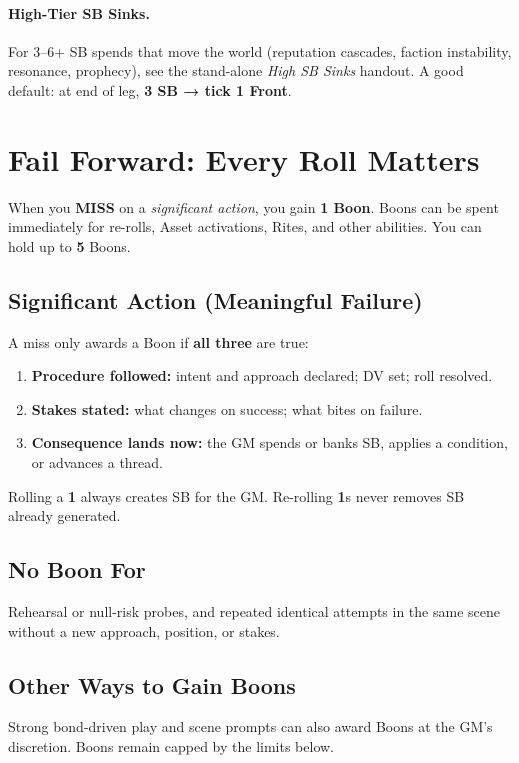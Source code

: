 \paragraph{High-Tier SB Sinks.}
For 3–6+ SB spends that move the world (reputation cascades, faction instability, resonance, prophecy), see the stand-alone \emph{High SB Sinks} handout. A good default: at end of leg, \textbf{3 SB → tick 1 Front}.

\section{Fail Forward: Every Roll Matters}

When you \textbf{MISS} on a \emph{significant action}, you gain \textbf{1 Boon}. Boons can be spent immediately for re-rolls, Asset activations, Rites, and other abilities. You can hold up to \textbf{5} Boons.

\subsection{Significant Action (Meaningful Failure)}
A miss only awards a Boon if \textbf{all three} are true:
\begin{enumerate}
  \item \textbf{Procedure followed:} intent and approach declared; DV set; roll resolved.
  \item \textbf{Stakes stated:} what changes on success; what bites on failure.
  \item \textbf{Consequence lands now:} the GM spends or banks SB, applies a condition, or advances a thread.
\end{enumerate}
\noindent Rolling a \textbf{1} always creates SB for the GM. Re-rolling \textbf{1}s never removes SB already generated.

\subsection{No Boon For}
Rehearsal or null-risk probes, and repeated identical attempts in the same scene without a new approach, position, or stakes.

\subsection{Other Ways to Gain Boons}
Strong bond-driven play and scene prompts can also award Boons at the GM's discretion. Boons remain capped by the limits below.

